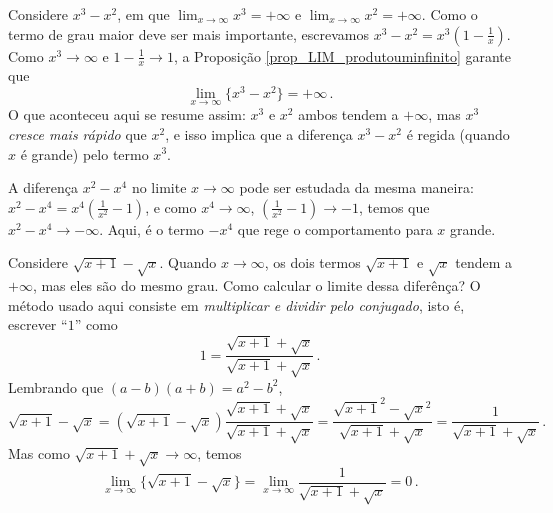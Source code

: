\begin{ex}
Considere $x^3-x^2$, em que $\lim_{x\to\infty}x^3=+\infty$ e
$\lim_{x\to\infty}x^2=+\infty$. Como o termo de grau
maior deve ser mais importante, escrevamos
$x^3-x^2=x^3(1-\frac{1}{x})$. Como $x^3\to\infty$ e
$1-\frac{1}{x}\to 1$, a Proposição \ref{prop_LIM_produtouminfinito} 
garante que 
\[\lim_{x\to\infty}\{x^3-x^2\}=+\infty\,.\]
O que aconteceu aqui se resume assim: $x^3$ e $x^2$ ambos tendem a
$+\infty$, mas $x^3$ \emph{cresce mais rápido} que $x^2$, e isso
implica que a diferença $x^3-x^2$ é regida (quando $x$ é grande)
pelo termo $x^3$.
\end{ex}

\begin{ex}
A diferença $x^2-x^4$ no limite $x\to\infty$ pode ser estudada da
mesma maneira: $x^2-x^4=x^4(\frac{1}{x^2}-1)$, e como $x^4\to\infty$,
$(\frac{1}{x^2}-1)\to-1$, temos que $x^2-x^4\to -\infty$.
Aqui, é o termo $-x^4$ que rege o comportamento para $x$ grande.
\end{ex}


\begin{ex}\label{Ex:conjugadobasico}
Considere $\sqrt{x+1}-\sqrt{x}$. Quando $x\to\infty$, os dois termos
$\sqrt{x+1}$ e $\sqrt{x}$ tendem a $+\infty$, mas eles são do mesmo grau. 
Como calcular o limite dessa diferênça? O método usado aqui consiste em
\emph{multiplicar e
dividir pelo conjugado}, isto é, escrever ``$1$'' como
$$
1=\frac{\sqrt{x+1}+\sqrt{x}}{
\sqrt{x+1}+\sqrt{x}}\,.
$$
Lembrando que $(a-b)(a+b)=a^2-b^2$,
$$
\sqrt{x+1}-\sqrt{x}=(\sqrt{x+1}-\sqrt{x})\frac{\sqrt{x+1}+\sqrt{x}}{
\sqrt{x+1}+\sqrt{x}}=\frac{\sqrt{x+1}^2-\sqrt{x}^2}{\sqrt{x+1}+\sqrt{
x}}=\frac{1}{\sqrt{x+1}+\sqrt{x}}\,.
$$
Mas como $\sqrt{x+1}+\sqrt{x}\to\infty$, temos
$$\lim_{x\to\infty}\{\sqrt{x+1}-\sqrt{x}\}=\lim_{x\to\infty}\frac{1}{
\sqrt{x+1}+\sqrt{x}}=0\,.$$ 
\end{ex}

